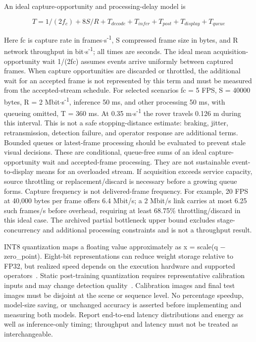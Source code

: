 \documentclass[11pt,letterpaper]{article}
\begin{document}
An ideal capture-opportunity and processing-delay model is

\begin{equation}
T=1/(2f_c)+8S/R+T_{decode}+T_{infer}+T_{post}+T_{display}+T_{queue}
\label{eq:15}
\end{equation}

Here fc is capture rate in frames\ensuremath{\cdot}s\textsuperscript{-}\textsuperscript{1}, S compressed frame size in bytes, and R network throughput in bit\ensuremath{\cdot}s\textsuperscript{-}\textsuperscript{1}; all times are seconds. The ideal mean acquisition-opportunity wait 1/(2fc) assumes events arrive uniformly between captured frames. When capture opportunities are discarded or throttled, the additional wait for an accepted frame is not represented by this term and must be measured from the accepted-stream schedule. For selected scenarios fc = 5 FPS, S = 40000 bytes, R = 2 Mbit\ensuremath{\cdot}s\textsuperscript{-}\textsuperscript{1}, inference 50 ms, and other processing 50 ms, with queueing omitted, T = 360 ms. At 0.35 m\ensuremath{\cdot}s\textsuperscript{-}\textsuperscript{1} the rover travels 0.126 m during this interval. This is not a safe stopping-distance estimate: braking, jitter, retransmission, detection failure, and operator response are additional terms. Bounded queues or latest-frame processing should be evaluated to prevent stale visual decisions. These are conditional, queue-free sums of an ideal capture-opportunity wait and accepted-frame processing. They are not sustainable event-to-display means for an overloaded stream. If acquisition exceeds service capacity, source throttling or replacement/discard is necessary before a growing queue forms. Capture frequency is not delivered-frame frequency. For example, 20 FPS at 40,000 bytes per frame offers 6.4 Mbit/s; a 2 Mbit/s link carries at most 6.25 such frames/s before overhead, requiring at least 68.75\% throttling/discard in this ideal case. The archived partial bottleneck upper bound excludes stage-concurrency and additional processing constraints and is not a throughput result.

INT8 quantization maps a floating value approximately as x = scale(q \ensuremath{-} zero\_point). Eight-bit representations can reduce weight storage relative to FP32, but realized speed depends on the execution hardware and supported operators~\cite{ENG_QUANT}. Static post-training quantization requires representative calibration inputs and may change detection quality~\cite{ENG_ONNX}. Calibration images and final test images must be disjoint at the scene or sequence level. No percentage speedup, model-size saving, or unchanged accuracy is asserted before implementing and measuring both models. Report end-to-end latency distributions and energy as well as inference-only timing; throughput and latency must not be treated as interchangeable.
\end{document}
